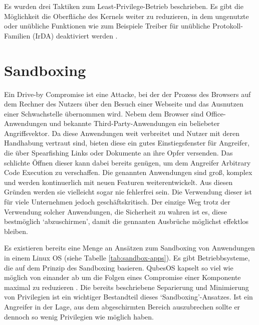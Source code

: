 Es wurden drei Taktiken zum Least-Privilege-Betrieb beschrieben. Es gibt die Möglichkeit die Oberfläche des Kernels weiter zu reduzieren, in dem ungenutzte oder unübliche Funktionen wie zum Beispiele Treiber für unübliche Protokoll-Familien (IrDA) deaktiviert werden \cite{subgraph-kernel-config}.


\section{Sandboxing}

Ein Drive-by Compromise ist eine Attacke, bei der der Prozess des Browsers auf dem Rechner des Nutzers über den Besuch einer Webseite und das Ausnutzen einer Schwachstelle übernommen wird. Nebem dem Browser sind Office-Anwendungen und bekannte Third-Party-Anwendungen ein beliebeter Angriffsvektor. Da diese Anwendungen weit verbreitet und Nutzer mit deren Handhabung vertraut sind, bieten diese ein gutes Einstiegsfenster für Angreifer, die über Spearfishing Links oder Dokumente an ihre Opfer
versenden. Das schlichte Öffnen dieser kann dabei bereits genügen, um dem Angreifer Arbitrary Code Execution zu verschaffen. Die genannten Anwendungen sind groß, komplex und werden kontinuerlich mit neuen Featuren weiterentwickelt. Aus diesen Gründen werden sie vielleicht sogar nie fehlerfrei sein. Die Verwendung dieser ist für viele Unternehmen jedoch geschäftskritisch. Der einzige Weg trotz der Verwendung solcher Anwendungen, die Sicherheit zu wahren ist es, diese bestmöglich
`abzuschirmen', damit die gennanten Ausbrüche möglichst effektlos bleiben.

Es existieren bereits eine Menge an Ansätzen zum Sandboxing von Anwendungen in einem Linux OS (siehe Tabelle \ref{tab:sandbox-apps}).
Es gibt Betriebbsysteme, die auf dem Prinzip des Sandboxing basieren. QubesOS kapselt so viel wie möglich von einander ab um die Folgen eines Compromise einer Komponente maximal zu reduzieren \cite{qubes}.
Die bereits beschriebene Separierung und Minimierung von Privilegien ist ein wichtiger Bestandteil dieses `Sandboxing'-Ansatzes. Ist ein Angreifer in der Lage, aus dem abgeschirmten Bereich auszubrechen sollte er dennoch so wenig Privilegien wie möglich haben.


